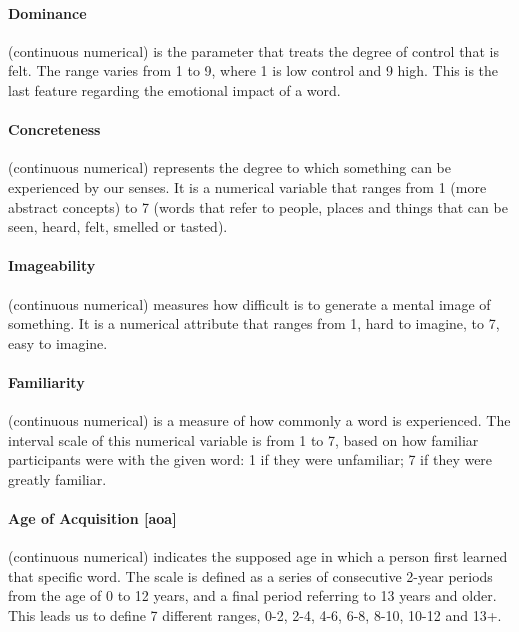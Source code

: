 \documentclass[a4paper,11pt,dvipsnames]{article}
\begin{document}
\paragraph{Dominance} (continuous numerical) is the parameter that treats the degree of control that is felt. The range varies from 1 to 9, where 1 is low control and 9 high. This is the last feature regarding the emotional impact of a word.
%
%
\paragraph{Concreteness} (continuous numerical) represents the degree to which something can be experienced by our senses. It is a numerical variable that ranges from 1 (more abstract concepts) to 7 (words that refer to people, places and things that can be seen, heard, felt, smelled or tasted).

\paragraph{Imageability} (continuous numerical) measures how difficult is to generate a mental image of something. It is a numerical attribute that ranges from 1, hard to imagine, to 7, easy to imagine. 

\paragraph{Familiarity} (continuous numerical) is a measure of how commonly a word is experienced. The interval scale of this numerical variable is from 1 to 7, based on how familiar participants were with the given word: 1 if they were unfamiliar; 7 if they were greatly familiar. 


\paragraph{Age of Acquisition [aoa]} (continuous numerical) indicates the supposed age in which a person first learned that specific word. The scale is defined as a series of consecutive 2-year periods from the age of 0 to 12 years, and a final period referring to 13 years and older. This leads us to define 7 different ranges, 0-2, 2-4, 4-6, 6-8, 8-10, 10-12 and 13+.

\end{document}

